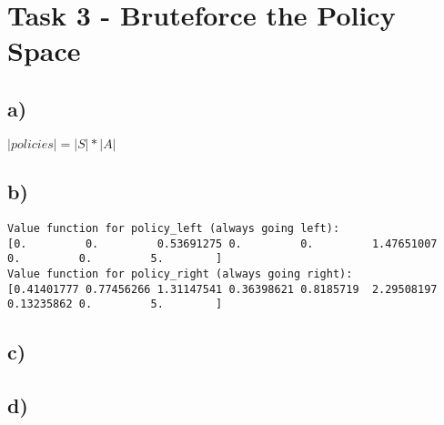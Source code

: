 \documentclass[a4paper]{article}
\begin{document}
\section*{Task 3 - Bruteforce the Policy Space}
\subsection*{a)}
$ |policies|  =  |S| * |A| $
\subsection*{b)}

\begin{lstlisting}
Value function for policy_left (always going left):
[0.         0.         0.53691275 0.         0.         1.47651007
0.         0.         5.        ]
Value function for policy_right (always going right):
[0.41401777 0.77456266 1.31147541 0.36398621 0.8185719  2.29508197
0.13235862 0.         5.        ]
\end{lstlisting}

\subsection*{c)}


\subsection*{d)}
\end{document}
